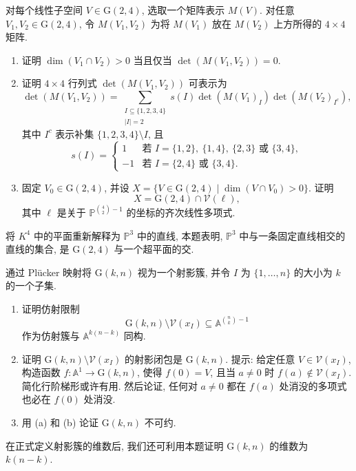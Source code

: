 \begin{BookExercises}
  \item\label{ex:lines-meeting-fixed-line-form-hyperplane-section} 对每个线性子空间 $V\in\mathrm{G}(2,4)$, 选取一个矩阵表示 $M(V)$. 对任意 $V_{1},V_{2}\in\mathrm{G}(2,4)$, 令 $M(V_{1},V_{2})$ 为将 $M(V_{1})$ 放在 $M(V_{2})$ 上方所得的 $4\times4$ 矩阵.
  \begin{enumerate}
    \item 证明 $\dim(V_{1}\cap V_{2})>0$ 当且仅当 $\det(M(V_{1},V_{2}))=0$.
    \item 证明 $4\times4$ 行列式 $\det(M(V_{1},V_{2}))$ 可表示为
    \[
      \det(M(V_{1},V_{2}))
      =\sum_{\substack{I\subseteq\{1,2,3,4\}\\|I|=2}}
       s(I)\det(M(V_{1})_{I})\det(M(V_{2})_{I^{c}}),
    \]
    其中 $I^{c}$ 表示补集 $\{1,2,3,4\}\setminus I$, 且
    \[
      s(I)=\begin{cases}
      1 & \text{若 }I=\{1,2\},\ \{1,4\},\ \{2,3\}\text{ 或 }\{3,4\},\\
      -1 & \text{若 }I=\{2,4\}\text{ 或 }\{3,4\}.
      \end{cases}
    \]
    \item 固定 $V_{0}\in\mathrm{G}(2,4)$, 并设 $X=\{V\in\mathrm{G}(2,4)\mid\dim(V\cap V_{0})>0\}$. 证明
    \[
      X=\mathrm{G}(2,4)\cap\mathcal{V}(\ell),
    \]
    其中 $\ell$ 是关于 $\mathbb{P}^{\binom{4}{2}-1}$ 的坐标的齐次线性多项式.
  \end{enumerate}
  将 $K^{4}$ 中的平面重新解释为 $\mathbb{P}^{3}$ 中的直线, 本题表明, $\mathbb{P}^{3}$ 中与一条固定直线相交的直线的集合, 是 $\mathrm{G}(2,4)$ 与一个超平面的交.
  \item\label{ex:grassmannian-affine-charts-and-irreducibility} 通过 Plücker 映射将 $\mathrm{G}(k,n)$ 视为一个射影簇, 并令 $I$ 为 $\{1,\ldots,n\}$ 的大小为 $k$ 的一个子集.
  \begin{enumerate}
    \item 证明仿射限制
    \[
      \mathrm{G}(k,n)\setminus\mathcal{V}(x_{I})
        \subseteq\mathbb{A}^{\binom{n}{k}-1}
    \]
    作为仿射簇与 $\mathbb{A}^{k(n-k)}$ 同构.
    \item 证明 $\mathrm{G}(k,n)\setminus\mathcal{V}(x_{I})$ 的射影闭包是 $\mathrm{G}(k,n)$.
    提示: 给定任意 $V\in\mathcal{V}(x_{I})$, 构造函数 $f:\mathbb{A}^{1}\to\mathrm{G}(k,n)$, 使得 $f(0)=V$, 且当 $a\ne0$ 时 $f(a)\notin\mathcal{V}(x_{I})$. 简化行阶梯形或许有用. 然后论证, 任何对 $a\ne0$ 都在 $f(a)$ 处消没的多项式也必在 $f(0)$ 处消没.
    \item 用 (a) 和 (b) 论证 $\mathrm{G}(k,n)$ 不可约.
  \end{enumerate}
  在正式定义射影簇的维数后, 我们还可利用本题证明 $\mathrm{G}(k,n)$ 的维数为 $k(n-k)$.
\end{BookExercises}
